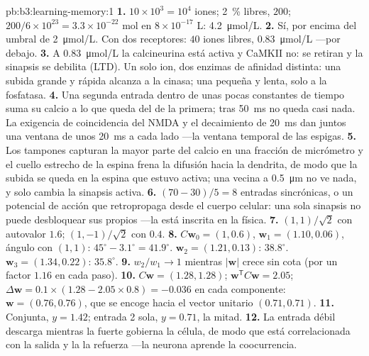 \begin{solution}{pb:b3:learning-memory:1}
\textbf{1.} $10\times 10^{3} = 10^{4}$ iones; \qty{2}{\%} libres, $200$;
$200/6\times 10^{23} = 3.3\times 10^{-22}$ mol en $8\times 10^{-17}$ L:
\qty{4.2}{\micro mol/L}.
\textbf{2.} Sí, por encima del umbral de \qty{2}{\micro mol/L}. Con dos
receptores: $40$ iones libres, \qty{0.83}{\micro mol/L} ---por debajo.
\textbf{3.} A \qty{0.83}{\micro mol/L} la calcineurina está activa y
CaMKII no: se retiran  y la sinapsis se debilita (LTD).
Un solo ion, dos enzimas de afinidad distinta: una subida grande y
rápida alcanza a la cinasa; una pequeña y lenta, solo a la fosfatasa.
\textbf{4.} Una segunda entrada dentro de unas pocas constantes de
tiempo suma su calcio a lo que queda del de la primera; tras
\qty{50}{ms} no queda casi nada. La exigencia de coincidencia del NMDA
y el decaimiento de \qty{20}{ms} dan juntos una ventana de unos
\qty{20}{ms} a cada lado ---la ventana temporal de las espigas.
\textbf{5.} Los tampones capturan la mayor parte del calcio en una
fracción de micrómetro y el cuello estrecho de la espina frena la
difusión hacia la dendrita, de modo que la subida se queda en la espina
que estuvo activa; una vecina a \qty{0.5}{\micro m} no ve nada, y solo
cambia la sinapsis activa.
\textbf{6.} $(70 - 30)/5 = 8$ entradas sincrónicas, o un potencial de
acción que retropropaga desde el cuerpo celular: una sola sinapsis no
puede desbloquear sus propios  ---la  está
inscrita en la física.
\textbf{7.} $(1,1)/\sqrt{2}$ con autovalor $1.6$; $(1,-1)/\sqrt{2}$ con
$0.4$.
\textbf{8.} $C\mathbf{w}_{0} = (1, 0.6)$, $\mathbf{w}_{1} = (1.10,
0.06)$, ángulo con $(1,1)$: $45^{\circ} - 3.1^{\circ} = 41.9^{\circ}$.
$\mathbf{w}_{2} = (1.21, 0.13)$: $38.8^{\circ}$. $\mathbf{w}_{3} = (1.34,
0.22)$: $35.8^{\circ}$.
\textbf{9.} $w_{2}/w_{1} \to 1$ mientras $|\mathbf{w}|$ crece sin cota
(por un factor $1.16$ en cada paso).
\textbf{10.} $C\mathbf{w} = (1.28, 1.28)$; $\mathbf{w}^{\mathsf{T}}C
\mathbf{w} = 2.05$; $\Delta\mathbf{w} = 0.1\times(1.28 - 2.05\times 0.8)
= -0.036$ en cada componente: $\mathbf{w} = (0.76, 0.76)$, que se encoge
hacia el vector unitario $(0.71, 0.71)$.
\textbf{11.} Conjunta, $y = 1.42$; entrada 2 sola, $y = 0.71$, la mitad.
\textbf{12.} La entrada débil descarga mientras la fuerte gobierna la
célula, de modo que está correlacionada con la salida y la  la refuerza ---la neurona aprende la coocurrencia.

\end{solution}
